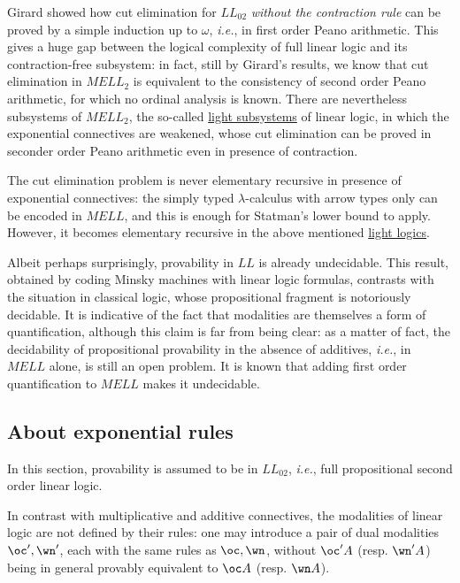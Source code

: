 Girard showed how cut elimination for \(LL_{02}\) \emph{without the
contraction rule} can be proved by a simple induction up to \(\omega\),
\emph{i.e.}, in first order Peano arithmetic. This gives a huge gap
between the logical complexity of full linear logic and its
contraction-free subsystem: in fact, still by Girard's results, we know
that cut elimination in \(MELL_2\) is equivalent to the consistency of
second order Peano arithmetic, for which no ordinal analysis is known.
There are nevertheless subsystems of \(MELL_2\), the so-called
\hyperref[light-linear-logics]{light subsystems} of linear logic, in which
the exponential connectives are weakened, whose cut elimination can be
proved in seconder order Peano arithmetic even in presence of
contraction.

The cut elimination problem is never elementary recursive in presence of
exponential connectives: the simply typed \(\lambda\)-calculus with
arrow types only can be encoded in \(MELL\), and this is enough for
Statman's lower bound to apply. However, it becomes elementary recursive
in the above mentioned \hyperref[light-linear-logics]{light logics}.

Albeit perhaps surprisingly, provability in \(LL\) is already
undecidable. This result, obtained by coding Minsky machines with linear
logic formulas, contrasts with the situation in classical logic, whose
propositional fragment is notoriously decidable. It is indicative of the
fact that modalities are themselves a form of quantification, although
this claim is far from being clear: as a matter of fact, the
decidability of propositional provability in the absence of additives,
\emph{i.e.}, in \(MELL\) alone, is still an open problem. It is known
that adding first order quantification to \(MELL\) makes it undecidable.

\subsection{About exponential rules}\label{about-exponential-rules}

In this section, provability is assumed to be in \(LL_{02}\),
\emph{i.e.}, full propositional second order linear logic.

In contrast with multiplicative and additive connectives, the modalities
of linear logic are not defined by their rules: one may introduce a pair
of dual modalities \(\oc',\wn'\), each with the same rules as
\(\oc,\wn\), without \(\oc'A\) (resp. \(\wn'A\)) being in general
provably equivalent to \(\oc A\) (resp. \(\wn A\)).

